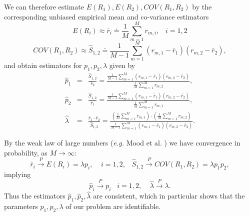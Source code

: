 \documentclass[a4paper,10pt,twoside]{article}
\begin{document}
We can therefore estimate $E(R_{1}),E(R_{2}),COV(R_{1},R_{2})$ by the corresponding unbiased empirical mean and co-variance estimators
$$E(R_{i})\approx \bar{r}_i\doteq\frac{1}{M}\sum_{m=1}^M r_{m,i},\;\;\;i=1,2$$
$$COV(R_{1},R_{2})\approx \hat{S}_{1,2}\doteq\frac{1}{M-1}\sum_{m=1}^M (r_{m,1}-\bar{r}_1)(r_{m,2}-\bar{r}_2),$$
and obtain estimators for $p_1,p_2,\lambda$ given by
\begin{eqnarray}\label{estimators}\hat{p}_1&=&\frac{\hat{S}_{1,2}}{\bar{r}_2}=\frac{\frac{1}{M-1}\sum_{m=1}^M (r_{m,1}-\bar{r}_1)(r_{m,2}-\bar{r}_2)}
{\frac{1}{M}\sum_{m=1}^M r_{m,2}},\nonumber\\
\hat{p}_2&=&\frac{\hat{S}_{1,2}}{\bar{r}_1}=\frac{\frac{1}{M-1}\sum_{m=1}^M (r_{m,1}-\bar{r}_1)(r_{m,2}-\bar{r}_2)}{\frac{1}{M}\sum_{m=1}^M r_{m,1}},\nonumber\\
\hat{\lambda}&=&\frac{\bar{r}_1\cdot \bar{r}_2}{\hat{S}_{1,2}} =\frac{\left(\frac{1}{M}\sum_{m=1}^M r_{m,1} \right)\cdot  \left(\frac{1}{M}\sum_{m=1}^M r_{m,2} \right)}{\frac{1}{M-1}\sum_{m=1}^M (r_{m,1}-\bar{r}_1)(r_{m,2}-\bar{r}_2)}.\end{eqnarray}

By the weak law of large numbers ({\it{e.g.}} Mood et al. \cite{mood}) we have convergence in probability, as $M\rightarrow \infty$:
$$\bar{r}_i \xrightarrow{P} E(R_i)=\lambda p_i,\;\;\;\;i=1,2,\;\;\;\hat{S}_{1,2}  \xrightarrow{P} COV(R_{1},R_{2})=\lambda p_1 p_2,$$
implying 
$$\hat{p}_i\xrightarrow{P}p_i\;\;\; i=1,2,\;\;\;\;\hat{\lambda}\xrightarrow{P} \lambda.$$
Thus the estimators $\hat{p}_1,\hat{p}_2,\hat{\lambda}$ are consistent, which in particular shows that the parameters 
$p_1,p_2,\lambda$ of our problem are identifiable.
\end{document}
